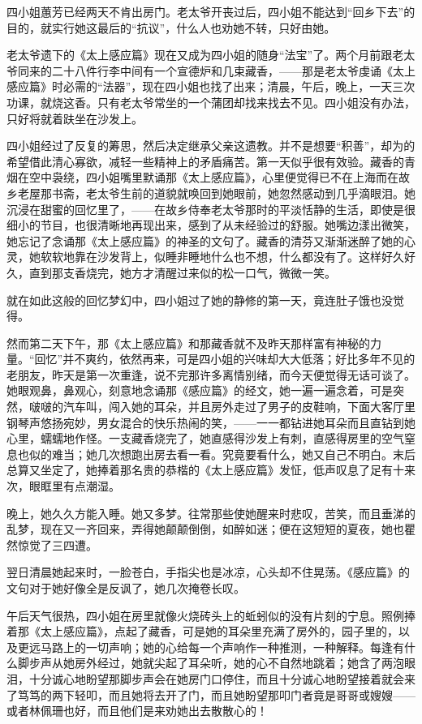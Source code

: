 \par 四小姐蕙芳已经两天不肯出房门。老太爷开丧过后，四小姐不能达到“回乡下去”的目的，就实行她这最后的“抗议”，什么人也劝她不转，只好由她。
\par 老太爷遗下的《太上感应篇》现在又成为四小姐的随身“法宝”了。两个月前跟老太爷同来的二十八件行李中间有一个宣德炉和几束藏香，——那是老太爷虔诵《太上感应篇》时必需的“法器”，现在四小姐也找了出来；清晨，午后，晚上，一天三次功课，就烧这香。只有老太爷常坐的一个蒲团却找来找去不见。四小姐没有办法，只好将就着趺坐在沙发上。
\par 四小姐经过了反复的筹思，然后决定继承父亲这遗教。并不是想要“积善”，却为的希望借此清心寡欲，减轻一些精神上的矛盾痛苦。第一天似乎很有效验。藏香的青烟在空中袅绕，四小姐嘴里默诵那《太上感应篇》，心里便觉得已不在上海而在故乡老屋那书斋，老太爷生前的道貌就唤回到她眼前，她忽然感动到几乎滴眼泪。她沉浸在甜蜜的回忆里了，——在故乡侍奉老太爷那时的平淡恬静的生活，即使是很细小的节目，也很清晰地再现出来，感到了从未经验过的舒服。她嘴边漾出微笑，她忘记了念诵那《太上感应篇》的神圣的文句了。藏香的清芬又渐渐迷醉了她的心灵，她软软地靠在沙发背上，似睡非睡地什么也不想，什么都没有了。这样好久好久，直到那支香烧完，她方才清醒过来似的松一口气，微微一笑。
\par 就在如此这般的回忆梦幻中，四小姐过了她的静修的第一天，竟连肚子饿也没觉得。
\par 然而第二天下午，那《太上感应篇》和那藏香就不及昨天那样富有神秘的力量。“回忆”并不爽约，依然再来，可是四小姐的兴味却大大低落；好比多年不见的老朋友，昨天是第一次重逢，说不完那许多离情别绪，而今天便觉得无话可谈了。她眼观鼻，鼻观心，刻意地念诵那《感应篇》的经文，她一遍一遍念着，可是突然，啵啵的汽车叫，闯入她的耳朵，并且房外走过了男子的皮鞋响，下面大客厅里钢琴声悠扬宛妙，男女混合的快乐热闹的笑，——一一都钻进她耳朵而且直钻到她心里，蠕蠕地作怪。一支藏香烧完了，她直感得沙发上有刺，直感得房里的空气窒息也似的难当；她几次想跑出房去看一看。究竟要看什么，她又自己不明白。末后总算又坐定了，她捧着那名贵的恭楷的《太上感应篇》发怔，低声叹息了足有十来次，眼眶里有点潮湿。
\par 晚上，她久久方能入睡。她又多梦。往常那些使她醒来时悲叹，苦笑，而且垂涕的乱梦，现在又一齐回来，弄得她颠颠倒倒，如醉如迷；便在这短短的夏夜，她也瞿然惊觉了三四遭。
\par 翌日清晨她起来时，一脸苍白，手指尖也是冰凉，心头却不住晃荡。《感应篇》的文句对于她好像全是反讽了，她几次掩卷长叹。
\par 午后天气很热，四小姐在房里就像火烧砖头上的蚯蚓似的没有片刻的宁息。照例捧着那《太上感应篇》，点起了藏香，可是她的耳朵里充满了房外的，园子里的，以及更远马路上的一切声响；她的心给每一个声响作一种推测，一种解释。每逢有什么脚步声从她房外经过，她就尖起了耳朵听，她的心不自然地跳着；她含了两泡眼泪，十分诚心地盼望那脚步声会在她房门口停住，而且十分诚心地盼望接着就会来了笃笃的两下轻叩，而且她将去开了门，而且她盼望那叩门者竟是哥哥或嫂嫂——或者林佩珊也好，而且他们是来劝她出去散散心的！
